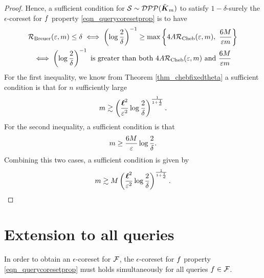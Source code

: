 \begin{proof}
	
	Hence, a sufficient condition for $\mathcal{S} \sim \mathcal{DPP}(\tilde{\boldsymbol K}_{m})$ to satisfy $1-\delta$-surely the $\epsilon$-coreset for $f$  property \ref{eqn_querycoresetprop} is to have
	\begin{gather*}
		\mathcal{R}_{\textrm{Breuer}}(\varepsilon,m) \leq \delta
		\iff 
		\left(\log \frac{2}{\delta }\right)^{-1} \geq
		\max\left\{
			4 A \mathcal{R}_{\textrm{Cheb}}(\varepsilon, m),\
			\frac{6 M}{\varepsilon m}\right\}
		\\
		\iff \left(\log \frac{2}{\delta }\right)^{-1} \text{ is greater than both }
		4 A \mathcal{R}_{\textrm{Cheb}}(\varepsilon, m)
		\text{ and }
		\frac{6 M}{\varepsilon m}
	\end{gather*}
	For the first inequality, we know from Theorem \ref{thm_chebfixedtheta} a sufficient condition is that for $n$ sufficiently large 
	\begin{equation*}
		m \gtrsim \left(\frac{\boldsymbol\ell^2}{\varepsilon^2} \log  \frac{2}{\delta } \right)^{\frac{1}{1+\frac 1 d}}.
	\end{equation*}
	For the second inequality, a sufficient condition is that
	\begin{equation*}
		m \geq \frac{6 M}{\varepsilon} \log  \frac{2}{\delta }.
	\end{equation*}
	Combining this two cases, a sufficient condition is given by
	\begin{equation*}
		m \gtrsim M\left(\frac{\boldsymbol\ell^2}{\varepsilon^2} \log  \frac{2}{\delta } \right)^{\frac{1}{1+\frac 1 d}}.
	\end{equation*}

\end{proof}
		 
		 



\section{Extension to all queries}
\label{sec_extension_all_queries}
In order to obtain an $\epsilon$-coreset for $\mathcal{F}$, the $\epsilon$-coreset for $f$ property \ref{eqn_querycoresetprop} must holds simultaneously for all queries $f \in \mathcal{F}$.









